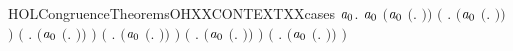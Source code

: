 \begin{SaveVerbatim}{HOLCongruenceTheoremsOHXXCONTEXTXXcases}
\HOLTokenTurnstile{} \HOLSymConst{\HOLTokenForall{}}\ensuremath{\HOLBoundVar{a}\sb{\mathrm{0}}}.
        \ensuremath{\HOLBoundVar{a}\sb{\mathrm{0}}} \HOLSymConst{\HOLTokenEquiv{}}
       \ensuremath{(}\ensuremath{\HOLBoundVar{a}\sb{\mathrm{0}}} \HOLSymConst{\ensuremath{=}} \ensuremath{(}\HOLTokenLambda{}. \ensuremath{)}\ensuremath{)} \HOLSymConst{\HOLTokenDisj{}}
       \ensuremath{(}\HOLSymConst{\HOLTokenExists{}} . \ensuremath{(}\ensuremath{\HOLBoundVar{a}\sb{\mathrm{0}}} \HOLSymConst{\ensuremath{=}} \ensuremath{(}\HOLTokenLambda{}. \HOLSymConst{\ensuremath{\ldotp}} \ensuremath{)}\ensuremath{)} \HOLSymConst{\HOLTokenConj{}}  \ensuremath{)} \HOLSymConst{\HOLTokenDisj{}}
       \ensuremath{(}\HOLSymConst{\HOLTokenExists{}} . \ensuremath{(}\ensuremath{\HOLBoundVar{a}\sb{\mathrm{0}}} \HOLSymConst{\ensuremath{=}} \ensuremath{(}\HOLTokenLambda{}.   \HOLSymConst{\ensuremath{+}} \ensuremath{)}\ensuremath{)} \HOLSymConst{\HOLTokenConj{}}  \ensuremath{)} \HOLSymConst{\HOLTokenDisj{}}
       \ensuremath{(}\HOLSymConst{\HOLTokenExists{}} . \ensuremath{(}\ensuremath{\HOLBoundVar{a}\sb{\mathrm{0}}} \HOLSymConst{\ensuremath{=}} \ensuremath{(}\HOLTokenLambda{}.  \HOLSymConst{\ensuremath{+}}  \ensuremath{)}\ensuremath{)} \HOLSymConst{\HOLTokenConj{}}  \ensuremath{)} \HOLSymConst{\HOLTokenDisj{}}
       \ensuremath{(}\HOLSymConst{\HOLTokenExists{}} . \ensuremath{(}\ensuremath{\HOLBoundVar{a}\sb{\mathrm{0}}} \HOLSymConst{\ensuremath{=}} \ensuremath{(}\HOLTokenLambda{}.   \HOLSymConst{\ensuremath{\mid}} \ensuremath{)}\ensuremath{)} \HOLSymConst{\HOLTokenConj{}}  \ensuremath{)} \HOLSymConst{\HOLTokenDisj{}}
       \ensuremath{(}\HOLSymConst{\HOLTokenExists{}} . \ensuremath{(}\ensuremath{\HOLBoundVar{a}\sb{\mathrm{0}}} \HOLSymConst{\ensuremath{=}} \ensuremath{(}\HOLTokenLambda{}.  \HOLSymConst{\ensuremath{\mid}}  \ensuremath{)}\ensuremath{)} \HOLSymConst{\HOLTokenConj{}}  \ensuremath{)} \HOLSymConst{\HOLTokenDisj{}}

\end{SaveVerbatim}
